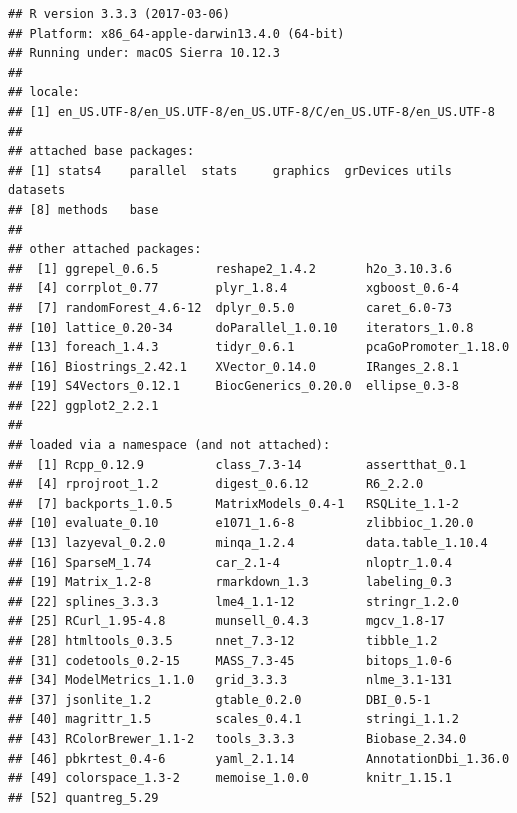 \documentclass[]{article}
\begin{document}
\begin{verbatim}
## R version 3.3.3 (2017-03-06)
## Platform: x86_64-apple-darwin13.4.0 (64-bit)
## Running under: macOS Sierra 10.12.3
## 
## locale:
## [1] en_US.UTF-8/en_US.UTF-8/en_US.UTF-8/C/en_US.UTF-8/en_US.UTF-8
## 
## attached base packages:
## [1] stats4    parallel  stats     graphics  grDevices utils     datasets 
## [8] methods   base     
## 
## other attached packages:
##  [1] ggrepel_0.6.5        reshape2_1.4.2       h2o_3.10.3.6        
##  [4] corrplot_0.77        plyr_1.8.4           xgboost_0.6-4       
##  [7] randomForest_4.6-12  dplyr_0.5.0          caret_6.0-73        
## [10] lattice_0.20-34      doParallel_1.0.10    iterators_1.0.8     
## [13] foreach_1.4.3        tidyr_0.6.1          pcaGoPromoter_1.18.0
## [16] Biostrings_2.42.1    XVector_0.14.0       IRanges_2.8.1       
## [19] S4Vectors_0.12.1     BiocGenerics_0.20.0  ellipse_0.3-8       
## [22] ggplot2_2.2.1       
## 
## loaded via a namespace (and not attached):
##  [1] Rcpp_0.12.9          class_7.3-14         assertthat_0.1      
##  [4] rprojroot_1.2        digest_0.6.12        R6_2.2.0            
##  [7] backports_1.0.5      MatrixModels_0.4-1   RSQLite_1.1-2       
## [10] evaluate_0.10        e1071_1.6-8          zlibbioc_1.20.0     
## [13] lazyeval_0.2.0       minqa_1.2.4          data.table_1.10.4   
## [16] SparseM_1.74         car_2.1-4            nloptr_1.0.4        
## [19] Matrix_1.2-8         rmarkdown_1.3        labeling_0.3        
## [22] splines_3.3.3        lme4_1.1-12          stringr_1.2.0       
## [25] RCurl_1.95-4.8       munsell_0.4.3        mgcv_1.8-17         
## [28] htmltools_0.3.5      nnet_7.3-12          tibble_1.2          
## [31] codetools_0.2-15     MASS_7.3-45          bitops_1.0-6        
## [34] ModelMetrics_1.1.0   grid_3.3.3           nlme_3.1-131        
## [37] jsonlite_1.2         gtable_0.2.0         DBI_0.5-1           
## [40] magrittr_1.5         scales_0.4.1         stringi_1.1.2       
## [43] RColorBrewer_1.1-2   tools_3.3.3          Biobase_2.34.0      
## [46] pbkrtest_0.4-6       yaml_2.1.14          AnnotationDbi_1.36.0
## [49] colorspace_1.3-2     memoise_1.0.0        knitr_1.15.1        
## [52] quantreg_5.29
\end{verbatim}
\end{document}
